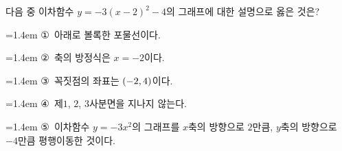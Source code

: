 다음 중 이차함수 $y=-3(x-2)^2-4$의 그래프에 대한 설명으로 옳은 것은?
\par\medskip\par\noindent\hangindent=1.4em {\small ①}\ 아래로 볼록한 포물선이다.\par\noindent\hangindent=1.4em {\small ②}\ 축의 방정식은 $x=-2$이다.\par\noindent\hangindent=1.4em {\small ③}\ 꼭짓점의 좌표는 $(-2{,}\mkern3mu 4)$이다.\par\noindent\hangindent=1.4em {\small ④}\ 제$1$, $2$, $3$사분면을 지나지 않는다.\par\noindent\hangindent=1.4em {\small ⑤}\ 이차함수 $y=-3x^2$의 그래프를 $x$축의 방향으로 $2$만큼, $y$축의 방향으로 $-4$만큼 평행이동한 것이다.\par\medskip
